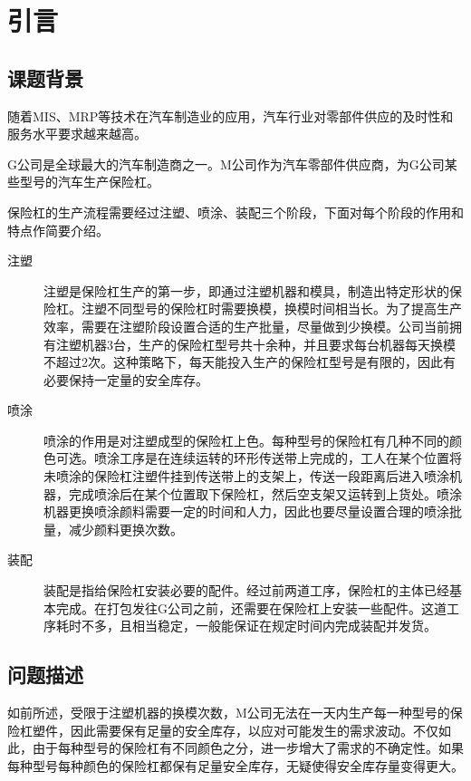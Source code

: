 \chapter{引言}

\section{课题背景}

随着MIS、MRP等技术在汽车制造业的应用，汽车行业对零部件供应的及时性和服务水平要求越来越高。

G公司是全球最大的汽车制造商之一。M公司作为汽车零部件供应商，为G公司某些型号的汽车生产保险杠。

保险杠的生产流程需要经过注塑、喷涂、装配三个阶段，下面对每个阶段的作用和特点作简要介绍。

\begin{description}
\item[注塑] 注塑是保险杠生产的第一步，即通过注塑机器和模具，制造出特定形状的保险杠。注塑不同型号的保险杠时需要换模，换模时间相当长。为了提高生产效率，需要在注塑阶段设置合适的生产批量，尽量做到少换模。公司当前拥有注塑机器3台，生产的保险杠型号共十余种，并且要求每台机器每天换模不超过2次。这种策略下，每天能投入生产的保险杠型号是有限的，因此有必要保持一定量的安全库存。

\item[喷涂] 喷涂的作用是对注塑成型的保险杠上色。每种型号的保险杠有几种不同的颜色可选。喷涂工序是在连续运转的环形传送带上完成的，工人在某个位置将未喷涂的保险杠注塑件挂到传送带上的支架上，传送一段距离后进入喷涂机器，完成喷涂后在某个位置取下保险杠，然后空支架又运转到上货处。喷涂机器更换喷涂颜料需要一定的时间和人力，因此也要尽量设置合理的喷涂批量，减少颜料更换次数。

\item[装配] 装配是指给保险杠安装必要的配件。经过前两道工序，保险杠的主体已经基本完成。在打包发往G公司之前，还需要在保险杠上安装一些配件。这道工序耗时不多，且相当稳定，一般能保证在规定时间内完成装配并发货。

\end{description}


\section{问题描述}

如前所述，受限于注塑机器的换模次数，M公司无法在一天内生产每一种型号的保险杠塑件，因此需要保有足量的安全库存，以应对可能发生的需求波动。不仅如此，由于每种型号的保险杠有不同颜色之分，进一步增大了需求的不确定性。如果每种型号每种颜色的保险杠都保有足量安全库存，无疑使得安全库存量变得更大。

